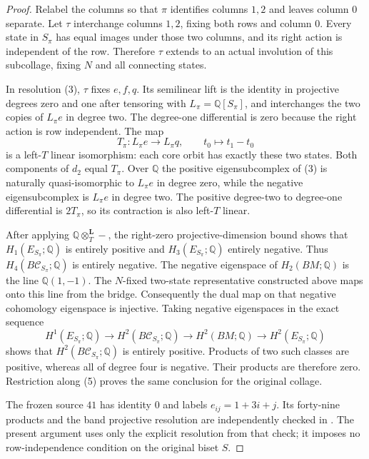 \begin{proof}
Relabel the columns so that $\pi$ identifies columns
$1,2$ and leaves column $0$ separate.
Let $\tau$ interchange columns $1,2$, fixing both
rows and column $0$.
Every state in $S_\pi$ has equal images under those
two columns, and its right action is independent
of the row.  Therefore $\tau$ extends to an actual
involution of this subcollage, fixing $N$ and
all connecting states.

In resolution (3), $\tau$ fixes $e,f,q$.
Its semilinear lift is the identity in projective
degrees zero and one after tensoring with
$L_\pi=\mathbb Q[S_\pi]$, and interchanges the two
copies of $L_\pi e$ in degree two.
The degree-one differential is zero because the
right action is row independent.
The map
\[
 T_\pi:L_\pi e\longrightarrow L_\pi q,
       \qquad t_0\longmapsto t_1-t_0
\]
is a left-$T$ linear isomorphism: each core orbit
has exactly these two states.
Both components of $d_2$ equal $T_\pi$.
Over $\mathbb Q$ the positive eigensubcomplex of
(3) is naturally quasi-isomorphic to $L_\pi e$
in degree zero, while the negative eigensubcomplex
is $L_\pi e$ in degree two.
The positive degree-two to degree-one differential
is $2T_\pi$, so its contraction is also left-$T$ linear.

After applying $\mathbb Q\otimes_T^{\mathbf L}-$,
the right-zero projective-dimension bound shows that
$H_1(E_{S_\pi};\mathbb Q)$ is entirely positive
and $H_3(E_{S_\pi};\mathbb Q)$ entirely negative.
Thus $H_4(B\mathcal C_{S_\pi};\mathbb Q)$ is
entirely negative.
The negative eigenspace of $H_2(BM;\mathbb Q)$
is the line $\mathbb Q(1,-1)$.
The $N$-fixed two-state representative constructed
above maps onto this line from the bridge.
Consequently the dual map on that negative
cohomology eigenspace is injective.
Taking negative eigenspaces in the exact sequence
\[
 H^1(E_{S_\pi};\mathbb Q)\longrightarrow
 H^2(B\mathcal C_{S_\pi};\mathbb Q)\longrightarrow
 H^2(BM;\mathbb Q)\longrightarrow
 H^2(E_{S_\pi};\mathbb Q)
\]
shows that $H^2(B\mathcal C_{S_\pi};\mathbb Q)$
is entirely positive.
Products of two such classes are positive, whereas
all of degree four is negative.
Their products are therefore zero.
Restriction along (5) proves the same conclusion
for the original collage.

The frozen source $41$ has identity $0$ and labels
$e_{ij}=1+3i+j$.  Its forty-nine products and the
band projective resolution are independently checked in
.
The present argument uses only the explicit resolution
from that check; it imposes no row-independence condition
on the original biset $S$.
\end{proof}
